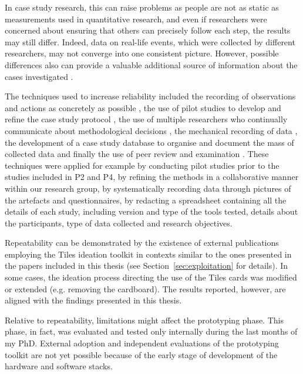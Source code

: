 In case study research, this can raise problems as people are not as static as measurements used in quantitative research, and even if researchers were concerned about ensuring that others can precisely follow each step, the results may still differ. Indeed, data on real-life events, which were collected by different researchers, may not converge into one consistent picture. However, possible differences also can provide a valuable additional source of information about the cases investigated \autocite{riege_validity_2003}.

The techniques used to increase reliability included the recording of observations and actions as concretely as possible \autocite{lecompte_problems_1982}, the use of pilot studies to develop and refine the case study protocol \autocites{eisenhardt_building_1989}{mitchell_industrial_1993}{yin_case_2017}, the use of multiple researchers who continually communicate about methodological decisions \autocite{lecompte_problems_1982}, the mechanical recording of data \autocite{nair_using_1995}, the development of a case study database to organise and document the mass of collected data \autocite{lincoln_naturalistic_1985} and finally the use of peer review and examination \autocite{lecompte_problems_1982}.
These techniques were applied for example by conducting pilot studies prior to the studies included in P2 and P4, by refining the methods in a collaborative manner within our research group, by systematically recording data through pictures of the artefacts and questionnaires, by redacting a spreadsheet containing all the details of each study, including version and type of the tools tested, details about the participants, type of data collected and research objectives.

Repeatability can be demonstrated by the existence of external publications employing the Tiles ideation toolkit in contexts similar to the ones presented in the papers included in this thesis (see Section~\ref{sec:exploitation} for details). In some cases, the ideation process directing the use of the Tiles cards was modified or extended (e.g. removing the cardboard). The results reported, however, are aligned with the findings presented in this thesis.

Relative to repeatability, limitations might affect the prototyping phase. This phase, in fact, was evaluated and tested only internally during the last months of my PhD. External adoption and independent evaluations of the prototyping toolkit are not yet possible because of the early stage of development of the hardware and software stacks.


